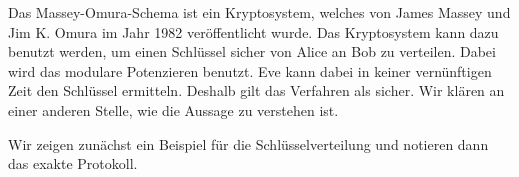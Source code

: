 \begin{hinweis}
	Das Massey-Omura-Schema ist ein Kryptosystem, welches von James Massey und Jim K. Omura im Jahr 1982 veröffentlicht wurde. Das Kryptosystem kann dazu benutzt werden, um einen Schlüssel sicher von Alice an Bob zu verteilen. Dabei wird das modulare Potenzieren benutzt. Eve kann dabei in keiner vernünftigen Zeit den Schlüssel ermitteln. Deshalb gilt das Verfahren als sicher. Wir klären an einer anderen Stelle, wie die Aussage  zu verstehen ist.
\end{hinweis}


Wir zeigen zunächst ein Beispiel für die Schlüsselverteilung und notieren dann das exakte Protokoll.

